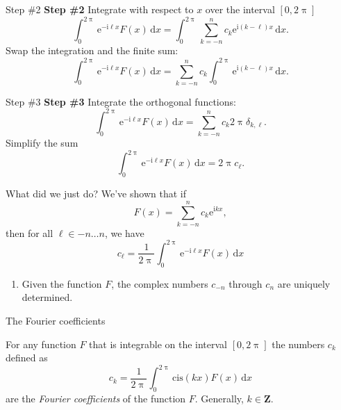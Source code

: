 \documentclass[portrait,fleqn,12pt]{beamer}
\newcommand{\integers}{\mathbf{Z}}
\newcommand{\cis}{\mathrm{cis}}
\newcommand{\euler}{\mathrm{e}}
\newcommand{\imag}{\mathrm{i}}
\newenvironment{handlist}
   {\begin{enumerate}[\faHandPointRight]
       \addtolength{\itemsep}{0.0\itemsep}}
     {\end{enumerate}}
\begin{document}
\begin{frame}{Step \#2}
    \textbf{Step \#2} Integrate with respect to $x$ over the 
    interval $[0, 2 \uppi]$
    \begin{equation}
       \int_0^{2 \uppi} \euler^{-\imag  \ell x} F(x) \,
         \mathrm{d}x =  \int_0^{2 \uppi} \sum_{k=-n}^n c_k 
        \euler^{\imag  (k - \ell) x} \,
        \mathrm{d}x.
 \end{equation}
 Swap the integration and the finite sum:
 \begin{equation}
       \int_0^{2 \uppi} \euler^{-\imag  \ell x} F(x) \,
         \mathrm{d}x =  \sum_{k=-n}^n c_k 
         \int_0^{2 \uppi}  \euler^{\imag  (k - \ell) x} \,   \mathrm{d}x.
 \end{equation}
 \end{frame}
 
 \begin{frame}{Step \#3}
   \textbf{Step \#3} Integrate the orthogonal functions:
   \begin{equation}
       \int_0^{2 \uppi} \euler^{-\imag  \ell x} F(x) \,
         \mathrm{d}x =  \sum_{k=-n}^n c_k  2 \uppi \delta_{k, \ell} .
       \end{equation}
   Simplify the sum
   \begin{equation}
       \int_0^{2 \uppi} \euler^{-\imag  \ell x} F(x) \,
         \mathrm{d}x =   2 \uppi c_\ell.
       \end{equation}
  
 \end{frame}
 
 \begin{frame}{What did we just do?}
 We've shown that if 
 \begin{equation}
    F(x) = \sum_{k=-n}^n c_k \euler^{\imag  k x},
\end{equation}
then for all $\ell \in -n \dots n$, we have
\begin{equation}
   c_\ell = \frac{1}{2 \uppi} \int_0^{2 \uppi} \euler^{-\imag  \ell x} F(x) \, \mathrm{d}x
\end{equation}
\begin{handlist}
\item Given the function $F$, the complex numbers $c_{-n}$ through $c_n$ are uniquely determined.
\end{handlist}
 \end{frame}
 
 \begin{frame}{The Fourier coefficients}
 
 For any function $F$ that is integrable on the interval $[0,2 \uppi]$ the numbers $c_k$ defined as
 \begin{equation*}
   c_k = \frac{1}{2 \uppi} \int_0^{2 \uppi} \cis(k x) F(x) \, \mathrm{d} x
 \end{equation*}
 are the \emph{Fourier coefficients} of the function $F$.  Generally, $k \in \integers$.
 
 
 \end{frame}
\end{document}
